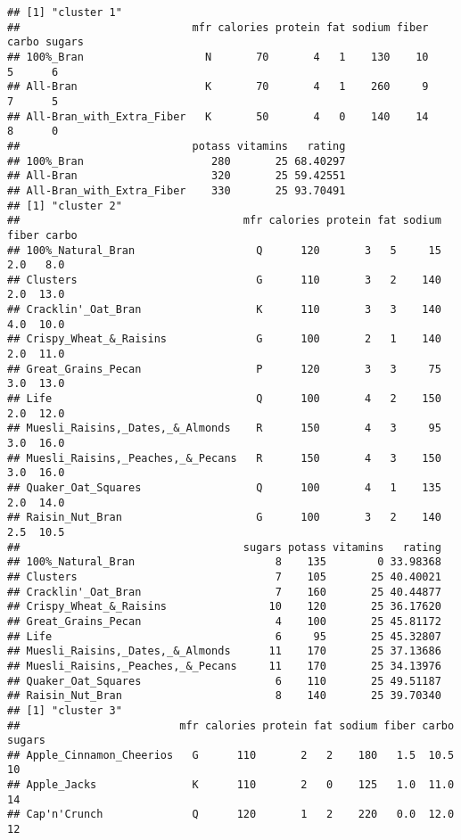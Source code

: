 \documentclass[
]{article}
\begin{document}
\begin{verbatim}
## [1] "cluster 1"
##                           mfr calories protein fat sodium fiber carbo sugars
## 100%_Bran                   N       70       4   1    130    10     5      6
## All-Bran                    K       70       4   1    260     9     7      5
## All-Bran_with_Extra_Fiber   K       50       4   0    140    14     8      0
##                           potass vitamins   rating
## 100%_Bran                    280       25 68.40297
## All-Bran                     320       25 59.42551
## All-Bran_with_Extra_Fiber    330       25 93.70491
## [1] "cluster 2"
##                                   mfr calories protein fat sodium fiber carbo
## 100%_Natural_Bran                   Q      120       3   5     15   2.0   8.0
## Clusters                            G      110       3   2    140   2.0  13.0
## Cracklin'_Oat_Bran                  K      110       3   3    140   4.0  10.0
## Crispy_Wheat_&_Raisins              G      100       2   1    140   2.0  11.0
## Great_Grains_Pecan                  P      120       3   3     75   3.0  13.0
## Life                                Q      100       4   2    150   2.0  12.0
## Muesli_Raisins,_Dates,_&_Almonds    R      150       4   3     95   3.0  16.0
## Muesli_Raisins,_Peaches,_&_Pecans   R      150       4   3    150   3.0  16.0
## Quaker_Oat_Squares                  Q      100       4   1    135   2.0  14.0
## Raisin_Nut_Bran                     G      100       3   2    140   2.5  10.5
##                                   sugars potass vitamins   rating
## 100%_Natural_Bran                      8    135        0 33.98368
## Clusters                               7    105       25 40.40021
## Cracklin'_Oat_Bran                     7    160       25 40.44877
## Crispy_Wheat_&_Raisins                10    120       25 36.17620
## Great_Grains_Pecan                     4    100       25 45.81172
## Life                                   6     95       25 45.32807
## Muesli_Raisins,_Dates,_&_Almonds      11    170       25 37.13686
## Muesli_Raisins,_Peaches,_&_Pecans     11    170       25 34.13976
## Quaker_Oat_Squares                     6    110       25 49.51187
## Raisin_Nut_Bran                        8    140       25 39.70340
## [1] "cluster 3"
##                         mfr calories protein fat sodium fiber carbo sugars
## Apple_Cinnamon_Cheerios   G      110       2   2    180   1.5  10.5     10
## Apple_Jacks               K      110       2   0    125   1.0  11.0     14
## Cap'n'Crunch              Q      120       1   2    220   0.0  12.0     12

\end{verbatim}
\end{document}

